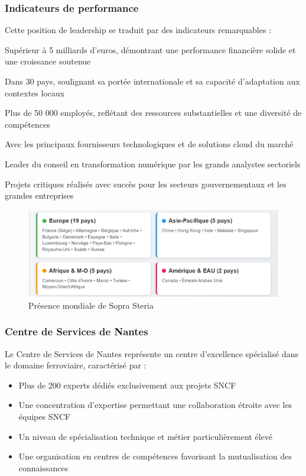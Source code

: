 \subsubsection{Indicateurs de performance}

Cette position de leadership se traduit par des indicateurs remarquables :

\begin{description}[leftmargin=3cm, labelwidth=2.5cm]
    \item[Chiffre d'affaires] Supérieur à 5 milliards d'euros, démontrant une performance financière solide et une croissance soutenue
    \item[Présence géographique] Dans 30 pays, soulignant sa portée internationale et sa capacité d'adaptation aux contextes locaux
    \item[Écosystème humain] Plus de 50 000 employés, reflétant des ressources substantielles et une diversité de compétences
    \item[Partenariats stratégiques] Avec les principaux fournisseurs technologiques et de solutions cloud du marché
    \item[Reconnaissance] Leader du conseil en transformation numérique par les grands analystes sectoriels
    \item[Portefeuille] Projets critiques réalisés avec succès pour les secteurs gouvernementaux et les grandes entreprises
\end{description}

\begin{figure}[H]
    \centering
    \includegraphics[scale=0.8]{figures/sopra_presence_mondiale.png}
    \caption{Présence mondiale de Sopra Steria}
    \label{fig:sopra_presence}
\end{figure}

\subsubsection{Centre de Services de Nantes}

Le Centre de Services de Nantes représente un centre d'excellence spécialisé dans le domaine ferroviaire, caractérisé par :
\begin{itemize}
    \item Plus de 200 experts dédiés exclusivement aux projets SNCF
    \item Une concentration d'expertise permettant une collaboration étroite avec les équipes SNCF
    \item Un niveau de spécialisation technique et métier particulièrement élevé
    \item Une organisation en centres de compétences favorisant la mutualisation des connaissances
\end{itemize}

